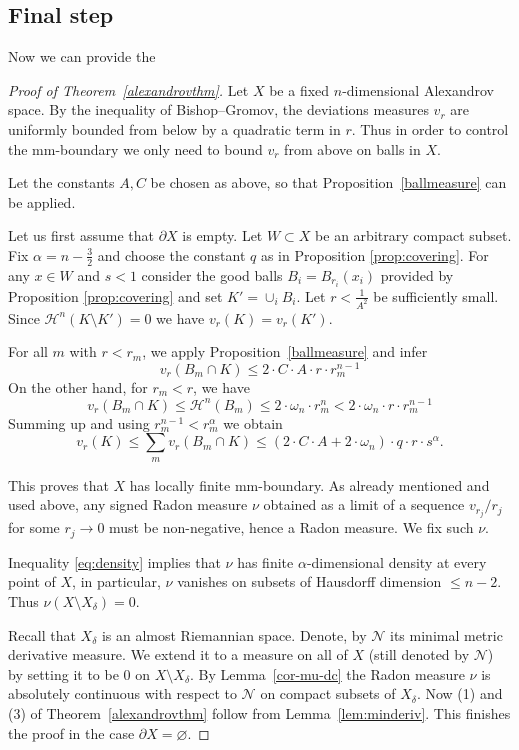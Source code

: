 \documentclass[12pt,leqno,intlimits]{amsart}
\numberwithin{equation}{section}
\theoremstyle{definition}
\theoremstyle{remark}
\newcommand{\tref}[1]{Theorem~\ref{#1}}
\newcommand{\pref}[1]{Proposition~\ref{#1}}
\newcommand{\lref}[1]{Lemma~\ref{#1}}
\def\emptyset{\varnothing}
\begin{document}
\subsection{Final step}
Now we can provide the
\begin{proof}[Proof of Theorem~\ref{alexandrovthm}]
Let $X$ be a fixed $n$-dimensional Alexandrov space. By the inequality of Bishop--Gromov, the deviations measures $v_r$ are uniformly bounded from below
by a quadratic term in $r$.
Thus in order to control the mm-boundary we only need to bound $v_r$ from above on balls in $X$.

Let the constants $A,C$ be chosen as above, so that \pref{ballmeasure} can be applied.

Let us first assume that $\partial X$ is empty.
Let $W\subset X$ be an arbitrary compact subset.
Fix $\alpha =n-\tfrac 3 2$ and choose the constant $q$ as in Proposition \ref{prop:covering}.
For any $x\in W$ and $s<1$ consider the good balls $B_i=B_{r_i} (x_i)$ provided by Proposition \ref{prop:covering} and set $K'=\cup _i B_i$. Let $r<\frac 1 {A^2}$ be sufficiently small. Since $\mathcal H^n (K\setminus K')=0$
we have $ v_r (K)=v_r (K')$.

For all $m$ with $r<r_m$, we apply \pref{ballmeasure} and infer
$$v_r(B_m \cap K)\le 2\cdot C\cdot A \cdot r\cdot r_m^{n-1} $$
On the other hand, for $r_m<r$, we have
$$v_r (B_m\cap K) \leq \mathcal H^n (B_m) \leq 2 \cdot \omega _n \cdot r_m ^n < 2\cdot \omega_n \cdot r \cdot r_m ^{n-1} $$
Summing up and using $r_m^{n-1} < r_m ^{\alpha}$ we obtain
\begin{equation} \label{eq:density}
v_r (K) \leq \sum_m v_r (B_m \cap K) \leq (2\cdot C\cdot A+2\cdot \omega _n) \cdot q\cdot r \cdot s^{\alpha}  .
\end{equation}

This proves that $X$ has locally finite mm-boundary.
As already mentioned and used above, any signed Radon measure $\nu$ obtained as a limit of a sequence $v_{r_j} /r_j$ for some $r_j\to 0$ must be non-negative, hence a Radon measure. We fix such $\nu$.

Inequality \eqref{eq:density} implies that $\nu$ has finite $\alpha$-dimensional density at every point of $X$, in particular, $\nu$ vanishes on subsets of Hausdorff dimension $\leq n-2$.
Thus $\nu (X \setminus X_{\delta } )=0$.

Recall that $X_{\delta}$ is an almost Riemannian space. Denote, by $\mathcal N $ its minimal metric derivative measure. We extend it to a measure on all of $X$ (still denoted by $\mathcal N $) by setting it to be $0$ on $X\setminus X_{\delta}$.
By \lref{cor-mu-dc} the Radon measure $\nu$ is absolutely continuous with respect to $\mathcal N $ on compact subsets of $X_{\delta}$.
Now (1) and (3) of \tref{alexandrovthm} follow from \lref{lem:minderiv}.
This finishes the proof in the case $\partial X=\emptyset$.


\end{proof}
\end{document}
